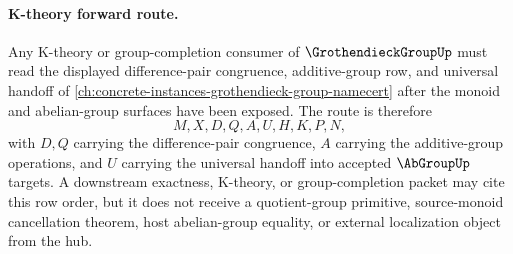 \paragraph{K-theory forward route.}
Any K-theory or group-completion consumer of $\GrothendieckGroupUp$ must read the displayed difference-pair congruence, additive-group row, and universal handoff of \autoref{ch:concrete-instances-grothendieck-group-namecert} after the monoid and abelian-group surfaces have been exposed. The route is therefore
$$
M,X,D,Q,A,U,H,K,P,N,
$$
with $D,Q$ carrying the difference-pair congruence, $A$ carrying the additive-group operations, and $U$ carrying the universal handoff into accepted $\AbGroupUp$ targets. A downstream exactness, K-theory, or group-completion packet may cite this row order, but it does not receive a quotient-group primitive, source-monoid cancellation theorem, host abelian-group equality, or external localization object from the hub.
